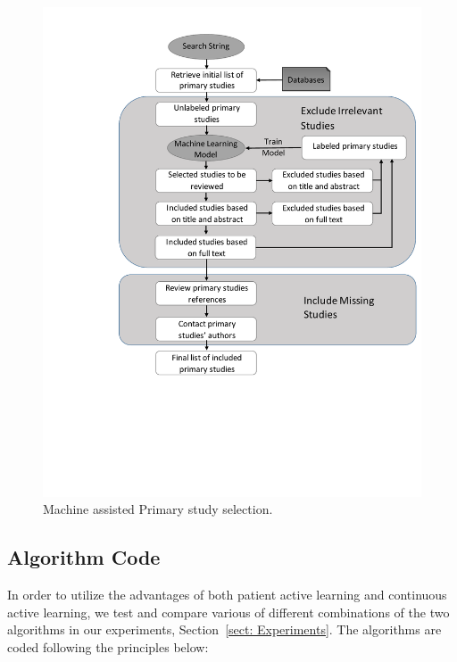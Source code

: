 \documentclass[final,twocolumn,5p]{elsarticle}
\theoremstyle{break}
\begin{document}
\begin{figure}[!t]
    \centering
    \includegraphics[width=\linewidth]{Learning_based_primary_study_selection.pdf}
    \caption{Machine assisted Primary study selection.}
    \label{fig: learning}
\end{figure}

\subsection{Algorithm Code}
\label{sect: Algorithm Code}

In order to utilize the advantages of both patient active learning and continuous active learning, we test and compare various of different combinations of the two algorithms in our experiments, Section~\ref{sect: Experiments}. The algorithms are coded following the principles below:
\end{document}
